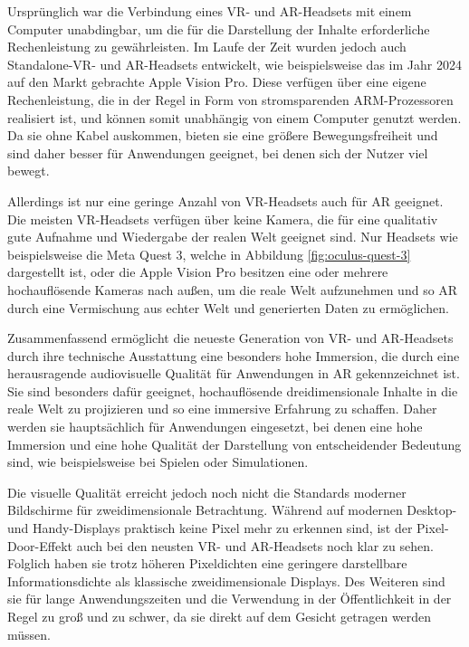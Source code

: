     
    Ursprünglich war die Verbindung eines VR- und AR-Headsets mit einem Computer unabdingbar, um die für die Darstellung der Inhalte erforderliche Rechenleistung zu gewährleisten.
    Im Laufe der Zeit wurden jedoch auch Standalone-VR- und AR-Headsets entwickelt, wie beispielsweise das im Jahr 2024 auf den Markt gebrachte Apple Vision Pro.
    Diese verfügen über eine eigene Rechenleistung, die in der Regel in Form von stromsparenden ARM-Prozessoren realisiert ist, und können somit unabhängig von einem Computer genutzt werden.
    Da sie ohne Kabel auskommen, bieten sie eine größere Bewegungsfreiheit und sind daher besser für Anwendungen geeignet, bei denen sich der Nutzer viel bewegt.

    Allerdings ist nur eine geringe Anzahl von VR-Headsets auch für AR geeignet.
    Die meisten VR-Headsets verfügen über keine Kamera, die für eine qualitativ gute Aufnahme und Wiedergabe der realen Welt geeignet sind.
    Nur Headsets wie beispielsweise die Meta Quest 3, welche in Abbildung \ref{fig:oculus-quest-3} dargestellt ist, oder die Apple Vision Pro besitzen eine oder mehrere hochauflösende Kameras nach außen, um die reale Welt aufzunehmen und so AR durch eine Vermischung aus echter Welt und generierten Daten zu ermöglichen.
    
    Zusammenfassend ermöglicht die neueste Generation von VR- und AR-Headsets durch ihre technische Ausstattung eine besonders hohe Immersion, die durch eine herausragende audiovisuelle Qualität für Anwendungen in AR gekennzeichnet ist.
    Sie sind besonders dafür geeignet, hochauflösende dreidimensionale Inhalte in die reale Welt zu projizieren und so eine immersive Erfahrung zu schaffen.
    Daher werden sie hauptsächlich für Anwendungen eingesetzt, bei denen eine hohe Immersion und eine hohe Qualität der Darstellung von entscheidender Bedeutung sind, wie beispielsweise bei Spielen oder Simulationen.

    Die visuelle Qualität erreicht jedoch noch nicht die Standards moderner Bildschirme für zweidimensionale Betrachtung.
    Während auf modernen Desktop- und Handy-Displays praktisch keine Pixel mehr zu erkennen sind, ist der Pixel-Door-Effekt auch bei den neusten VR- und AR-Headsets noch klar zu sehen.
    Folglich haben sie trotz höheren Pixeldichten eine geringere darstellbare Informationsdichte als klassische zweidimensionale Displays.
    Des Weiteren sind sie für lange Anwendungszeiten und die Verwendung in der Öffentlichkeit in der Regel zu groß und zu schwer, da sie direkt auf dem Gesicht getragen werden müssen.

